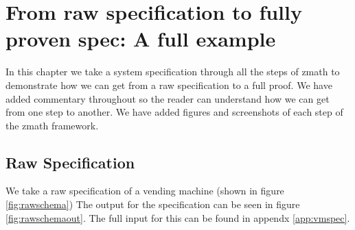 \chapter{From raw specification to fully proven spec: A full example}
\label{ch:fullexample}

In this chapter we take a system specification through all the steps of \gls{zmath} to demonstrate how we can get from a raw specification to a full proof. We have added commentary throughout so the reader can understand how we can get from one step to another. We have added figures and screenshots of each step of the \gls{zmath} framework.

\section{Raw Specification}
We take a raw specification of a vending machine (shown in figure \ref{fig:rawschema}) The output for the specification can be seen in figure \ref{fig:rawschemaout}. The full input for this can be found in appendx \ref{app:vmspec}.

